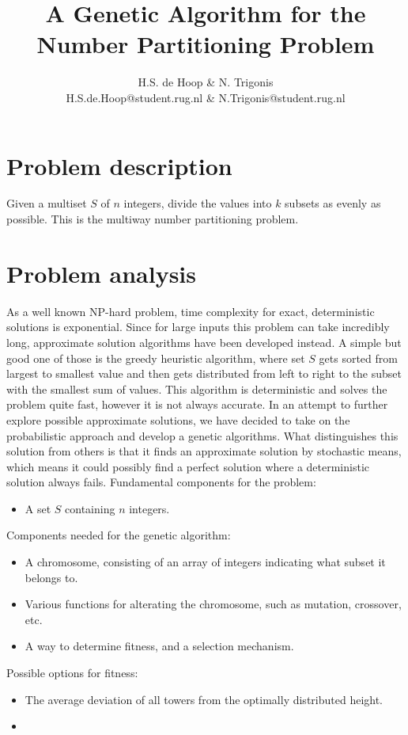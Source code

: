 \documentclass[a4paper,10pt]{article}
\title{A Genetic Algorithm for the Number Partitioning Problem}
\author{H.S. de Hoop \& N. Trigonis\\
        H.S.de.Hoop@student.rug.nl \& N.Trigonis@student.rug.nl}
\begin{document}
\maketitle

\section{Problem description}
Given a multiset $S$ of $n$ integers, divide the values into $k$ subsets as evenly as possible.
This is the multiway number partitioning problem.
\section{Problem analysis}


As a well known NP-hard problem, time complexity for exact, deterministic solutions is exponential.
Since for large inputs this problem can take incredibly long, approximate solution algorithms have been developed instead.
A simple but good one of those is the greedy heuristic algorithm, where set $S$ gets sorted from largest to smallest value and then gets distributed from left to right to the subset with the smallest sum of values.
This algorithm is deterministic and solves the problem quite fast, however it is not always accurate.
In an attempt to further explore possible approximate solutions, we have decided to take on the probabilistic approach and develop a genetic algorithms.
What distinguishes this solution from others is that it finds an approximate solution by stochastic means, which means it could possibly find a perfect solution where a deterministic solution always fails.
\newline
Fundamental components for the problem:
\begin{itemize}
  \item A set $S$ containing $n$ integers.
\end{itemize}

Components needed for the genetic algorithm:
\begin{itemize}
  \item A chromosome, consisting of an array of integers indicating what subset it belongs to.
  \item Various functions for alterating the chromosome, such as mutation, crossover, etc.
  \item A way to determine fitness, and a selection mechanism.
\end{itemize}

Possible options for fitness:
\begin{itemize}
  \item The average deviation of all towers from the optimally distributed height.
  \item 
\end{itemize}
\end{document}
